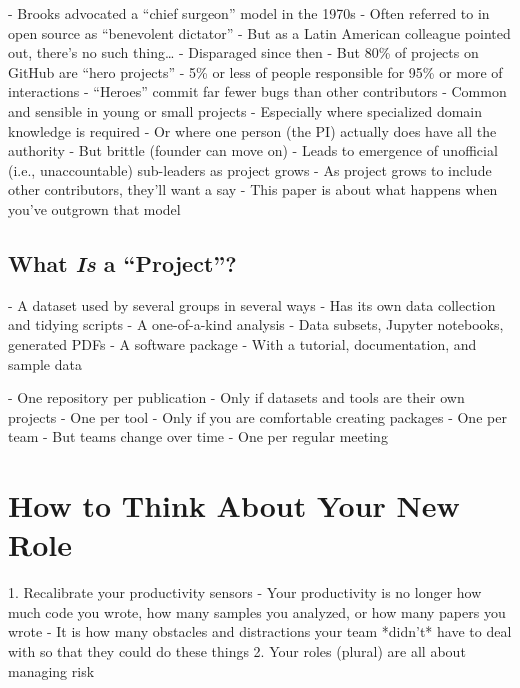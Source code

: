 \documentclass[10pt,letterpaper]{article}
\begin{document}
- Brooks advocated a ``chief surgeon'' model in the 1970s \cite{Brooks1995}
  - Often referred to in open source as ``benevolent dictator''
  - But as a Latin American colleague pointed out, there's no such thing{\ldots}
- Disparaged since then
  - But 80\% of projects on GitHub are ``hero projects'' \cite{Majumder2019}
  - 5\% or less of people responsible for 95\% or more of interactions
  - ``Heroes'' commit far fewer bugs than other contributors
- Common and sensible in young or small projects
  - Especially where specialized domain knowledge is required
  - Or where one person (the PI) actually does have all the authority
  - But brittle (founder can move on)
  - Leads to emergence of unofficial (i.e., unaccountable) sub-leaders as project grows
  - As project grows to include other contributors, they'll want a say
  - This paper is about what happens when you've outgrown that model

\subsection*{What \emph{Is} a ``Project''?}

- A dataset used by several groups in several ways
  - Has its own data collection and tidying scripts
- A one-of-a-kind analysis
  - Data subsets, Jupyter notebooks, generated PDFs
- A software package
  - With a tutorial, documentation, and sample data

- One repository per publication
  - Only if datasets and tools are their own projects
- One per tool
  - Only if you are comfortable creating packages
- One per team
  - But teams change over time
- One per regular meeting

\section{How to Think About Your New Role}

1. Recalibrate your productivity sensors
   - Your productivity is no longer how much code you wrote, how many samples you analyzed, or how many papers you wrote
   - It is how many obstacles and distractions your team *didn't* have to deal with so that they could do these things
2. Your roles (plural) are all about managing risk
\end{document}
